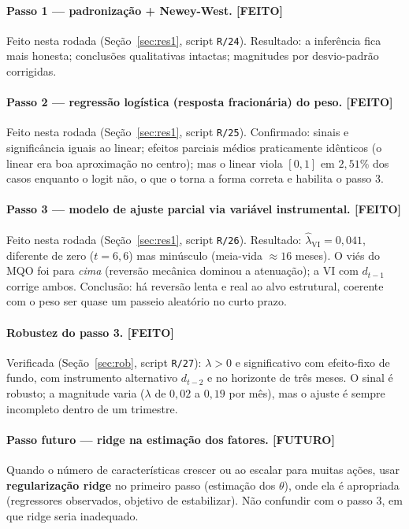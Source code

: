 \documentclass[11pt,a4paper]{article}
\newcommand{\feito}{\textcolor{feitog}{\textbf{[FEITO]}}}
\newcommand{\futuro}{\textcolor{fazerb}{\textbf{[FUTURO]}}}
\begin{document}
\paragraph{Passo 1 --- padronização + Newey-West. \feito} Feito nesta rodada (Seção~\ref{sec:res1},
script \texttt{R/24}). Resultado: a inferência fica mais honesta; conclusões qualitativas
intactas; magnitudes por desvio-padrão corrigidas.

\paragraph{Passo 2 --- regressão logística (resposta fracionária) do peso. \feito} Feito nesta
rodada (Seção~\ref{sec:res1}, script \texttt{R/25}). Confirmado: sinais e significância iguais ao
linear; efeitos parciais médios praticamente idênticos (o linear era boa aproximação no centro);
mas o linear viola $[0,1]$ em $2{,}51\%$ dos casos enquanto o logit não, o que o torna a forma
correta e habilita o passo 3.

\paragraph{Passo 3 --- modelo de ajuste parcial via variável instrumental. \feito} Feito nesta
rodada (Seção~\ref{sec:res1}, script \texttt{R/26}). Resultado: $\widehat{\lambda}_{\text{VI}}=0{,}041$,
diferente de zero ($t=6{,}6$) mas minúsculo (meia-vida $\approx16$ meses). O viés do MQO foi para
\emph{cima} (reversão mecânica dominou a atenuação); a VI com $d_{t-1}$ corrige ambos. Conclusão:
há reversão lenta e real ao alvo estrutural, coerente com o peso ser quase um passeio aleatório no
curto prazo.

\paragraph{Robustez do passo 3. \feito} Verificada (Seção~\ref{sec:rob}, script \texttt{R/27}):
$\lambda>0$ e significativo com efeito-fixo de fundo, com instrumento alternativo $d_{t-2}$ e no
horizonte de três meses. O sinal é robusto; a magnitude varia ($\lambda$ de $0{,}02$ a $0{,}19$ por
mês), mas o ajuste é sempre incompleto dentro de um trimestre.

\paragraph{Passo futuro --- ridge na estimação dos fatores. \futuro} Quando o número de
características crescer ou ao escalar para muitas ações, usar \textbf{regularização ridge} no
primeiro passo (estimação dos $\theta$), onde ela é apropriada (regressores observados, objetivo
de estabilizar). Não confundir com o passo 3, em que ridge seria inadequado.
\end{document}
